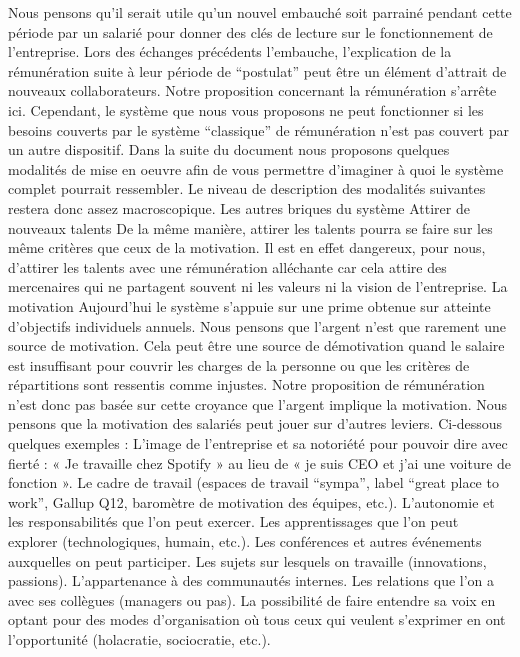 \documentclass[12pt]{article}
\begin{document}
 Nous pensons qu’il serait utile qu’un nouvel embauché soit parrainé pendant cette période par un salarié pour donner des clés de lecture sur le fonctionnement de l’entreprise.
 Lors des échanges précédents l’embauche, l’explication de la rémunération suite à leur période de “postulat” peut être un élément d’attrait de nouveaux collaborateurs. 
 Notre proposition concernant la rémunération s’arrête ici. 
 Cependant, le système que nous vous proposons ne peut fonctionner si les besoins couverts par le système “classique” de rémunération n’est pas couvert par un autre dispositif. Dans la suite du document nous proposons quelques modalités de mise en oeuvre afin de vous permettre d’imaginer à quoi le système complet pourrait ressembler. Le niveau de description des modalités suivantes restera donc assez macroscopique.
 Les autres briques du système
 Attirer de nouveaux talents
 De la même manière, attirer les talents pourra se faire sur les même critères que ceux de la motivation. Il est en effet dangereux, pour nous, d’attirer les talents avec une rémunération alléchante car cela attire des mercenaires qui ne partagent souvent ni les valeurs ni la vision de l’entreprise.
 La motivation
 Aujourd’hui le système s’appuie sur une prime obtenue sur atteinte d’objectifs individuels annuels. 
 Nous pensons que l’argent n’est que rarement une source de motivation. Cela peut être une source de démotivation quand le salaire est insuffisant pour couvrir les charges de la personne ou que les critères de répartitions sont ressentis comme injustes. Notre proposition de rémunération n’est donc pas basée sur cette croyance que l’argent implique la motivation. 
 Nous pensons que la motivation des salariés peut jouer sur d’autres leviers. Ci-dessous quelques exemples :
 L’image de l’entreprise et sa notoriété pour pouvoir dire avec fierté : « Je travaille chez Spotify » au lieu de « je suis CEO et j’ai une voiture de fonction ».
 Le cadre de travail (espaces de travail “sympa”, label “great place to work”, Gallup Q12, baromètre de motivation des équipes, etc.).
 L’autonomie et les responsabilités que l’on peut exercer.
 Les apprentissages que l’on peut explorer (technologiques, humain, etc.).
 Les conférences et autres événements auxquelles on peut participer.
 Les sujets sur lesquels on travaille (innovations, passions).
 L’appartenance à des communautés internes.
 Les relations que l’on a avec ses collègues (managers ou pas).
 La possibilité de faire entendre sa voix en optant pour des modes d’organisation où tous ceux qui veulent s’exprimer en ont l’opportunité (holacratie, sociocratie, etc.).
\end{document}
